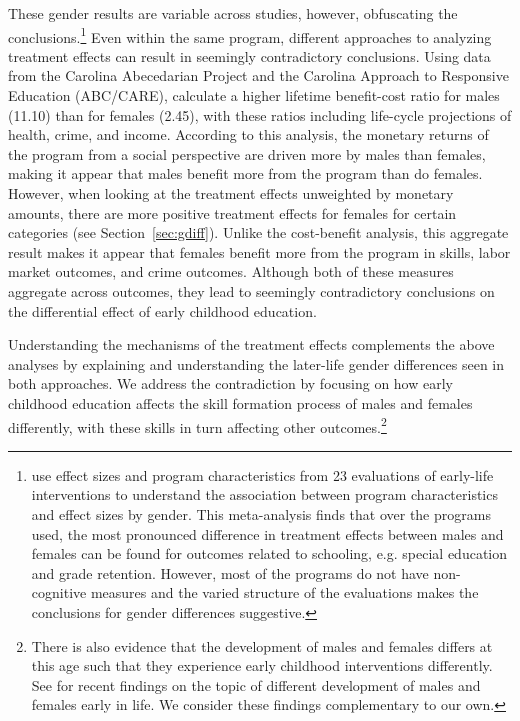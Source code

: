 These gender results are variable across studies, however, obfuscating the conclusions.\footnote{\citet{Magnuson_Kelchen_Duncan_etal_2016_ECRQ} use effect sizes and program characteristics from 23 evaluations of early-life interventions to understand the association between program characteristics and effect sizes by gender. This meta-analysis finds that over the programs used, the most pronounced difference in treatment effects between males and females can be found for outcomes related to schooling, e.g. special education and grade retention. However, most of the programs do not have non-cognitive measures and the varied structure of the evaluations makes the conclusions for gender differences suggestive.} Even within the same program, different approaches to analyzing treatment effects can result in seemingly contradictory conclusions. Using data from the Carolina Abecedarian Project and the Carolina Approach to Responsive Education (ABC/CARE), \citet{Garcia_etal_2016_Comp_CBA_Unpublished} calculate a higher lifetime benefit-cost ratio for males (11.10) than for females (2.45), with these ratios including life-cycle projections of health, crime, and income. According to this analysis, the monetary returns of the program from a social perspective are driven more by males than females, making it appear that males benefit more from the program than do females. However, when looking at the treatment effects unweighted by monetary amounts, there are more positive treatment effects for females for certain categories (see Section~\ref{sec:gdiff}). Unlike the cost-benefit analysis, this aggregate result makes it appear that females benefit more from the program in skills, labor market outcomes, and crime outcomes. Although both of these measures aggregate across outcomes, they lead to seemingly contradictory conclusions on the differential effect of early childhood education.

Understanding the mechanisms of the treatment effects complements the above analyses by explaining and understanding the later-life gender differences seen in both approaches. We address the contradiction by focusing on how early childhood education affects the skill formation process of males and females differently, with these skills in turn affecting other outcomes.\footnote{There is also evidence that the development of males and females differs at this age such that they experience early childhood interventions differently. See \citet{Beeghly-etal_2017_IMHJ,Dayton_2017_IMHJ,Iruka_2017_IMHJ,Schore_2017_IMHJ} for recent findings on the topic of different development of males and females early in life. We consider these findings complementary to our own.}

